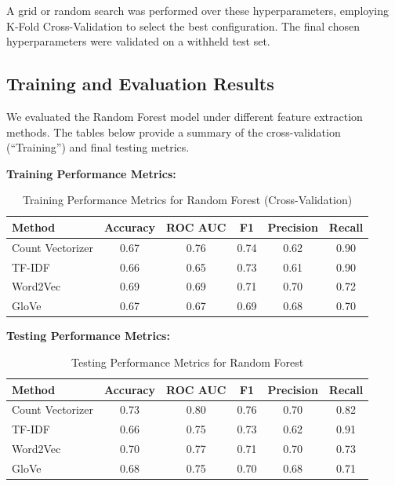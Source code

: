 A grid or random search was performed over these hyperparameters, employing K-Fold Cross-Validation to select the best configuration. The final chosen hyperparameters were validated on a withheld test set.

\subsection{Training and Evaluation Results}

We evaluated the Random Forest model under different feature extraction methods. The tables below provide a summary of the cross-validation (“Training”) and final testing metrics.

\textbf{Training Performance Metrics:}

\begin{table}[H]
    \centering
    \caption{Training Performance Metrics for Random Forest (Cross-Validation)}
    \label{tab:rf-training-metrics}
    \begin{tabular}{|l|c|c|c|c|c|}
        \hline
        \textbf{Method} & \textbf{Accuracy} & \textbf{ROC AUC} & \textbf{F1} & \textbf{Precision} & \textbf{Recall} \\ 
        \hline
        Count Vectorizer & 0.67 & 0.76 & 0.74 & 0.62 & 0.90 \\ 
        \hline
        TF-IDF & 0.66 & 0.65 & 0.73 & 0.61 & 0.90 \\ 
        \hline
        Word2Vec & 0.69 & 0.69 & 0.71 & 0.70 & 0.72 \\ 
        \hline
        GloVe & 0.67 & 0.67 & 0.69 & 0.68 & 0.70 \\ 
        \hline
    \end{tabular}
\end{table}

\textbf{Testing Performance Metrics:}

\begin{table}[H]
    \centering
    \caption{Testing Performance Metrics for Random Forest}
    \label{tab:rf-testing-metrics}
    \begin{tabular}{|l|c|c|c|c|c|}
        \hline
        \textbf{Method} & \textbf{Accuracy} & \textbf{ROC AUC} & \textbf{F1} & \textbf{Precision} & \textbf{Recall} \\ 
        \hline
        Count Vectorizer & 0.73 & 0.80 & 0.76 & 0.70 & 0.82 \\ 
        \hline
        TF-IDF & 0.66 & 0.75 & 0.73 & 0.62 & 0.91 \\ 
        \hline
        Word2Vec & 0.70 & 0.77 & 0.71 & 0.70 & 0.73 \\ 
        \hline
        GloVe & 0.68 & 0.75 & 0.70 & 0.68 & 0.71 \\ 
        \hline
    \end{tabular}
\end{table}

